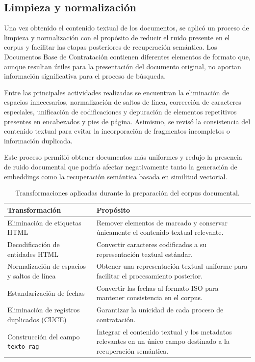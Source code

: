 \subsection{Limpieza y normalización}

Una vez obtenido el contenido textual de los documentos, se aplicó un proceso de limpieza y normalización con el propósito de reducir el ruido presente en el corpus y facilitar las etapas posteriores de recuperación semántica. Los Documentos Base de Contratación contienen diferentes elementos de formato que, aunque resultan útiles para la presentación del documento original, no aportan información significativa para el proceso de búsqueda.

Entre las principales actividades realizadas se encuentran la eliminación de espacios innecesarios, normalización de saltos de línea, corrección de caracteres especiales, unificación de codificaciones y depuración de elementos repetitivos presentes en encabezados y pies de página. Asimismo, se revisó la consistencia del contenido textual para evitar la incorporación de fragmentos incompletos o información duplicada.

Este proceso permitió obtener documentos más uniformes y redujo la presencia de ruido documental que podría afectar negativamente tanto la generación de embeddings como la recuperación semántica basada en similitud vectorial.

\begin{table}[H]
\centering
\caption{Transformaciones aplicadas durante la preparación del corpus documental.}
\label{tab:transformaciones_corpus}

\begin{tabular}{p{6cm}p{8cm}}
\toprule
\textbf{Transformación} & \textbf{Propósito} \\
\midrule
Eliminación de etiquetas HTML &
Remover elementos de marcado y conservar únicamente el contenido textual relevante. \\

Decodificación de entidades HTML &
Convertir caracteres codificados a su representación textual estándar. \\

Normalización de espacios y saltos de línea &
Obtener una representación textual uniforme para facilitar el procesamiento posterior. \\

Estandarización de fechas &
Convertir las fechas al formato ISO para mantener consistencia en el corpus. \\

Eliminación de registros duplicados (CUCE) &
Garantizar la unicidad de cada proceso de contratación. \\

Construcción del campo \texttt{texto\_rag} &
Integrar el contenido textual y los metadatos relevantes en un único campo destinado a la recuperación semántica. \\
\bottomrule
\end{tabular}
\end{table}

